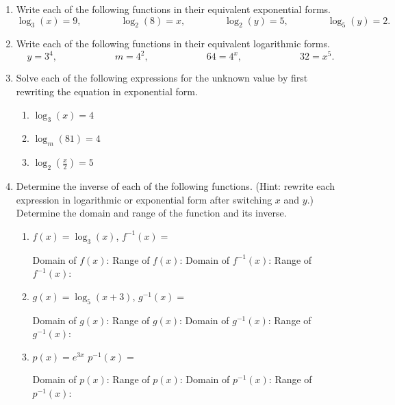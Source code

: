 \begin{enumerate}
\item Write each of the following functions in their equivalent  exponential forms.
  $$\log_3(x)=9,   \quad \quad \quad \quad
  \log_2(8)=x,     \quad \quad \quad \quad
  \log_2(y)=5,     \quad \quad  \quad \quad
  \log_5(y)=2.$$
\vfill
\item Write each of the following functions in their equivalent  logarithmic forms.
  $$y=3^4,  \quad \quad \quad \quad \quad \quad
  m=4^2,    \quad \quad \quad \quad \quad \quad
  64=4^x,   \quad \quad \quad \quad  \quad \quad
  32=x^5.$$
\vfill
\item Solve each of the following expressions for the unknown value by
  first rewriting the equation in exponential form.
\begin{enumerate}
\item $\log_3(x)=4$
\vfill
\vfill
\item $\log_{m}(81)=4$
\vfill
\vfill
\item $\displaystyle \log_2\left(\frac{x}{2}\right)=5$
\vfill
\vfill
\end{enumerate}



\clearpage
\item Determine the inverse of each of the following functions.
  (Hint: rewrite each expression in logarithmic or exponential form
  after switching $x$ and $y$.)  Determine the domain and range of the
  function and its inverse.
\begin{enumerate}
\item $f(x)=\log_3(x)$, \quad \quad \quad $f^{-1}(x)=$
\begin{flushright}
 Domain of $f(x)$:  \quad \quad \quad\quad\quad\quad Range of $f(x)$:\quad\quad\quad\quad \vfill
Domain of $f^{-1}(x)$:   \quad \quad\quad\quad\quad Range of $f^{-1}(x)$:\quad\quad\quad\quad
\end{flushright}
\vfill
\item $g(x)=\log_5(x+3)$,  \quad \quad \quad $g^{-1}(x)=$
\begin{flushright}
Domain of $g(x)$:  \quad \quad \quad\quad\quad\quad Range of $g(x)$:\quad\quad\quad\quad \vfill
Domain of $g^{-1}(x)$:   \quad \quad\quad\quad\quad Range of $g^{-1}(x)$:\quad\quad\quad\quad
\end{flushright}

\vfill 


\item $p(x)=e^{3x}$  \quad \quad \quad $p^{-1}(x)=$
\begin{flushright}
Domain of $p(x)$:  \quad \quad \quad\quad\quad\quad Range of $p(x)$:\quad\quad\quad\quad \vfill 
Domain of $p^{-1}(x)$:   \quad \quad\quad\quad\quad Range of $p^{-1}(x)$:\quad\quad\quad\quad
\end{flushright}



\end{enumerate}
\end{enumerate}
